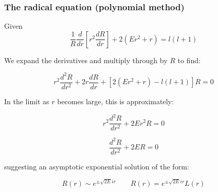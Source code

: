 \documentclass{beamer}
\begin{document}

\begin{frame}
\frametitle{The radical equation (polynomial method)}
Given
\[ \frac{1}{R} \frac{d}{dr}\left[ r^2 \frac{dR}{dr}\right] + 2(Er^2 + r) = l(l+1) \]

We expand the derivatives and multiply through by $R$ to find:

\[ r^2 \frac{d^2R}{dr^2} + 2r \frac{dR}{dr} + \left[2(E r^2+r) - l(l+1)\right] R = 0 \]

In the limit as $r$ becomes large, this is approximately:

\[ r^2 \frac{d^2R}{dr^2} + 2E r^2 R = 0 \]

\[ \frac{d^2R}{dr^2} + 2E R = 0 \]

suggesting an asymptotic exponential solution of the form:

\[ R(r) \sim e^{\pm \sqrt{2E}ir} \qquad R(r) = e^{\pm \sqrt{2E}ir} L(r) \]

\end{frame}

\end{document}
